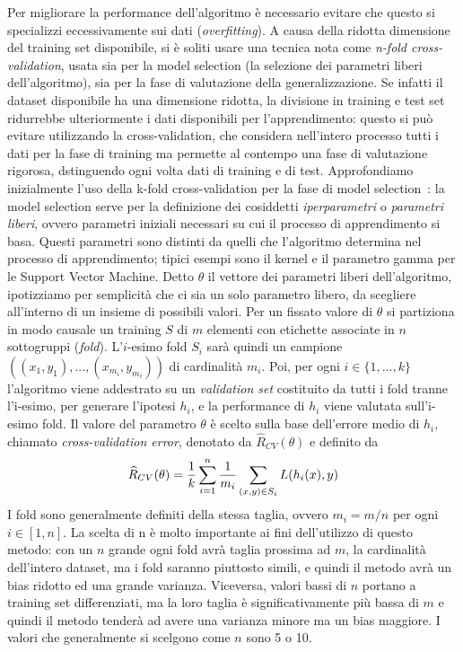 \documentclass[oneside, openany]{book}
\begin{document}
		Per migliorare la performance dell'algoritmo è necessario evitare che questo si specializzi eccessivamente sui dati (\textit{overfitting}). A causa della ridotta dimensione del training set disponibile, si è soliti usare una tecnica nota come \textit{n-fold cross-validation}, usata sia per la model selection (la selezione dei parametri liberi dell'algoritmo), sia per la fase di valutazione della generalizzazione. Se infatti il dataset disponibile ha una dimensione ridotta, la divisione in training e test set ridurrebbe ulteriormente i dati disponibili per l'apprendimento: questo si può evitare utilizzando la cross-validation, che considera nell'intero processo tutti i dati per la fase di training ma permette al contempo una fase di valutazione rigorosa, dstinguendo ogni volta dati di training e di test.\newline
		Approfondiamo inizialmente l'uso della k-fold cross-validation per la fase di model selection~\cite{bib:cv}: la model selection serve per la definizione dei cosiddetti \textit{iperparametri} o \textit{parametri liberi}, ovvero parametri iniziali necessari su cui il processo di apprendimento si basa. Questi parametri sono distinti da quelli che l'algoritmo determina nel processo di apprendimento; tipici esempi sono il kernel e il parametro gamma per le Support Vector Machine.\newline
		Detto $\theta$ il vettore dei parametri liberi dell'algoritmo, ipotizziamo per semplicità che ci sia un solo parametro libero, da scegliere all'interno di un insieme di possibili valori. Per un fissato valore di $\theta$ si partiziona in modo causale un training $S$ di $m$ elementi con etichette associate in $n$ sottogruppi (\textit{fold}). L'$i$-esimo fold $S_i$ sarà quindi un campione $((x_{1}, y_{1}),...,(x_{m_i},y_{m_i}))$ di cardinalità $m_i$. Poi, per ogni $i\in\{1, ..., k\}$ l'algoritmo viene addestrato su un \textit{validation set} costituito da tutti i fold tranne l'i-esimo, per generare l'ipotesi $h_i$, e la performance di $h_i$ viene valutata sull'i-esimo fold. Il valore del parametro $\theta$ è scelto sulla base dell'errore medio di $h_i$, chiamato \textit{cross-validation error}, denotato da $\widehat{R}_{CV}(\theta)$ e definito da
		\[
		\widehat{R}_{CV}(\theta)={1\over k}\sum_{i=1}^n {1\over m_i}\sum_{(x,y)\in S_i} L(h_i(x),y)
		\]
		I fold sono generalmente definiti della stessa taglia, ovvero $m_i=m/n$ per ogni $i\in[1,n]$. La scelta di n è molto importante ai fini dell'utilizzo di questo metodo: con un $n$ grande ogni fold avrà taglia prossima ad $m$, la cardinalità dell'intero dataset, ma i fold saranno piuttosto simili, e quindi il metodo avrà un bias ridotto ed una grande varianza. Viceversa, valori bassi di $n$ portano a training set differenziati, ma la loro taglia è significativamente più bassa di $m$ e quindi il metodo tenderà ad avere una varianza minore ma un bias maggiore. I valori che generalmente si scelgono come $n$ sono 5 o 10.\newline
\end{document}
